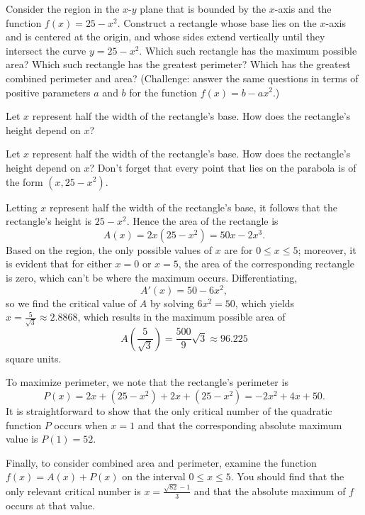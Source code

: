 \begin{activity} \label{A:3.4.3}  
Consider the region in the $x$-$y$ plane that is bounded by the $x$-axis and the function $f(x) = 25-x^2$.  Construct a rectangle whose base lies on the $x$-axis and is centered at the origin, and whose sides extend vertically until they intersect the curve $y = 25-x^2$.  Which such rectangle has the maximum possible area?  Which such rectangle has the greatest perimeter?  Which has the greatest combined perimeter and area?  (Challenge: answer the same questions in terms of positive parameters $a$ and $b$ for the function $f(x) = b-ax^2$.)
\end{activity}
\begin{smallhint}
Let $x$ represent half the width of the rectangle's base.  How does the rectangle's height depend on $x$?
\end{smallhint}
\begin{bighint}
Let $x$ represent half the width of the rectangle's base.  How does the rectangle's height depend on $x$?  Don't forget that every point that lies on the parabola is of the form $(x,25-x^2)$.  
\end{bighint}
\begin{activitySolution}
Letting $x$ represent half the width of the rectangle's base, it follows that the rectangle's height is $25-x^2$.  Hence the area of the rectangle is
$$A(x) = 2x(25-x^2) = 50x - 2x^3.$$ 
Based on the region, the only possible values of $x$ are for $0 \le x \le 5$; moreover, it is evident that for either $x = 0$ or $x = 5$, the area of the corresponding rectangle is zero, which can't be where the maximum occurs.  Differentiating,
$$A'(x) = 50 - 6x^2,$$
so we find the critical value of $A$ by solving $6x^2 = 50$, which yields $x = \frac{5}{\sqrt{3}} \approx 2.8868$, which results in the maximum possible area of 
$$A(\frac{5}{\sqrt{3}}) = \frac{500}{9}\sqrt{3} \approx 96.225$$
square units.

To maximize perimeter, we note that the rectangle's perimeter is 
$$P(x) = 2x + (25-x^2) + 2x + (25 - x^2) = -2x^2 + 4x + 50.$$
It is straightforward to show that the only critical number of the quadratic function $P$ occurs when $x = 1$ and that the corresponding absolute maximum value is $P(1) = 52$.

Finally, to consider combined area and perimeter, examine the function $f(x) = A(x) + P(x)$ on the interval $0 \le x \le 5.$  You should find that the only relevant critical number is $x = \frac{\sqrt{82}-1}{3}$ and that the absolute maximum of $f$ occurs at that value.
\end{activitySolution}
\aftera